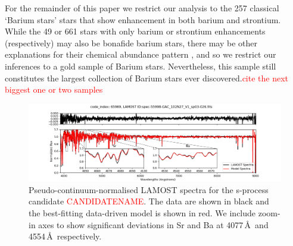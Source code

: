 \documentclass[a4paper,fleqn,usenatbib]{mnras}
\newcommand{\todo}[1]{\textcolor{red}{#1}}
\begin{document}
For the remainder of this paper we restrict our analysis to the 257 classical `Barium stars' stars that show enhancement in both barium and strontium. While the 49 or 661 stars with only barium or strontium enhancements (respectively) may also be bonafide barium stars, there may be other explanations for their chemical abundance pattern \citep[e.g.,][]{maiorca2011}, and so we restrict our inferences to a gold sample of Barium stars. Nevertheless, this sample still constitutes the largest collection of Barium stars ever discovered.\todo{cite the next biggest one or two samples}






\begin{figure}
	\includegraphics[width=\textwidth]{posterchild.png}
    \caption{Pseudo-continuum-normalised LAMOST spectra for the s-process candidate \todo{CANDIDATENAME}. The data are shown in black and the best-fitting data-driven model is shown in red. We include zoom-in axes to show significant deviations in Sr and Ba at  4077\,\AA\ and 4554\,\AA\, respectively.}
    \label{fig:figure1}
\end{figure}
\end{document}
